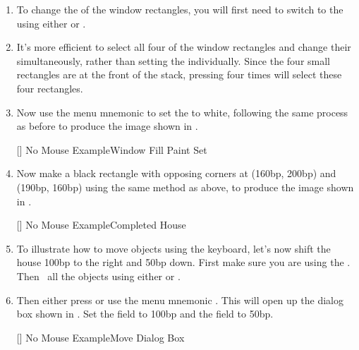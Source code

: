 \begin{enumerate}
[]
{}
{No Mouse Example\dash Windows Added}

\item To change the  of the window rectangles, you will
first need to switch to the  using either 
 or .

\item It's more efficient to select all four of the window
rectangles and change their  simultaneously,
rather than setting the  individually. Since
the four small rectangles are at the \gls{front} of the \gls{stack},
pressing  four times will select
these four rectangles.

\item Now use the menu mnemonic
 to set the 
to white, following the same process as before to produce the
image shown in .

[]
{}
{No Mouse Example\dash Window Fill Paint Set}

\item Now make a black rectangle with
opposing corners at (160bp, 200bp) and (190bp, 160bp) using the
same method as above, to produce the image shown in
.

[]
{}
{No Mouse Example\dash Completed House}

\item To illustrate how to move \glspl{object} using the keyboard, let's
now shift the house 100bp to the right and 50bp down. First make
sure you are using the . Then \select\ all the objects using
either  or .

\item Then either press  or use the menu mnemonic
. This will open up the  dialog box
shown in . Set the
 field to 100bp and the
 field to 50bp.

[]
{}
{No Mouse Example\dash Move Dialog Box}


\end{enumerate}
